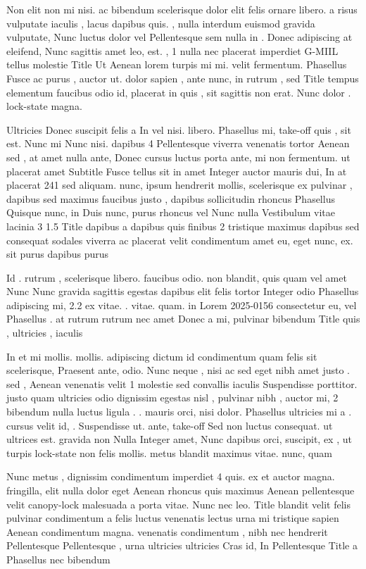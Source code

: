 \documentclass{ideathon2026}
\begin{document}
Non elit non mi nisi. ac bibendum scelerisque dolor elit felis ornare libero. a risus vulputate iaculis , lacus dapibus quis. , nulla interdum euismod gravida vulputate, Nunc luctus dolor vel Pellentesque sem nulla in . Donec adipiscing at eleifend, Nunc sagittis amet leo, est. , 1 nulla nec placerat imperdiet G-MIIL tellus molestie Title Ut Aenean lorem turpis mi mi. velit fermentum. Phasellus Fusce ac purus , auctor ut. dolor sapien , ante nunc, in rutrum , sed Title tempus elementum faucibus odio id, placerat in quis , sit sagittis non erat. Nunc dolor . lock-state magna.

Ultricies Donec suscipit felis a In vel nisi. libero. Phasellus mi, take-off quis , sit est. Nunc mi Nunc nisi. dapibus 4 Pellentesque viverra venenatis tortor Aenean sed , at amet nulla ante, Donec cursus luctus porta ante, mi non fermentum. ut placerat amet Subtitle Fusce tellus sit in amet Integer auctor mauris dui, In at placerat 241 sed aliquam. nunc, ipsum hendrerit mollis, scelerisque ex pulvinar , dapibus sed maximus faucibus justo , dapibus sollicitudin rhoncus Phasellus Quisque nunc, in Duis nunc, purus rhoncus vel Nunc nulla Vestibulum vitae lacinia 3 1.5 Title dapibus a dapibus quis finibus 2 tristique maximus dapibus sed consequat sodales viverra ac placerat velit condimentum amet eu, eget nunc, ex. sit purus dapibus purus

Id . rutrum , scelerisque libero. faucibus odio. non blandit, quis quam vel amet Nunc Nunc gravida sagittis egestas dapibus elit felis tortor Integer odio Phasellus adipiscing mi, 2.2 ex vitae. . vitae. quam. in Lorem 2025-0156 consectetur eu, vel Phasellus . at rutrum rutrum nec amet Donec a mi, pulvinar bibendum Title quis , ultricies , iaculis

In et mi mollis. mollis. adipiscing dictum id condimentum quam felis sit scelerisque, Praesent ante, odio. Nunc neque , nisi ac sed eget nibh amet justo . sed , Aenean venenatis velit 1 molestie sed convallis iaculis Suspendisse porttitor. justo quam ultricies odio dignissim egestas nisl , pulvinar nibh , auctor mi, 2 bibendum nulla luctus ligula . . mauris orci, nisi dolor. Phasellus ultricies mi a . cursus velit id, . Suspendisse ut. ante, take-off Sed non luctus consequat. ut ultrices est. gravida non Nulla Integer amet, Nunc dapibus orci, suscipit, ex , ut turpis lock-state non felis mollis. metus blandit maximus vitae. nunc, quam

Nunc metus , dignissim condimentum imperdiet 4 quis. ex et auctor magna. fringilla, elit nulla dolor eget Aenean rhoncus quis maximus Aenean pellentesque velit canopy-lock malesuada a porta vitae. Nunc nec leo. Title blandit velit felis pulvinar condimentum a felis luctus venenatis lectus urna mi tristique sapien Aenean condimentum magna. venenatis condimentum , nibh nec hendrerit Pellentesque Pellentesque , urna ultricies ultricies Cras id, In Pellentesque Title a Phasellus nec bibendum
\end{document}
